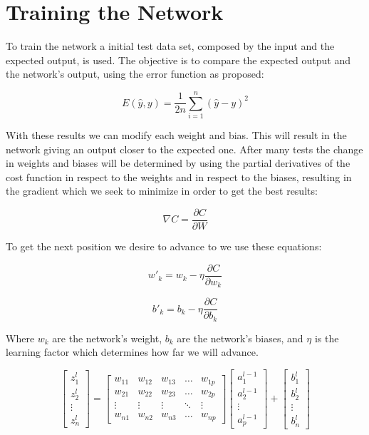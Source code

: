 \documentclass[a4paper, 12pts]{amsart}
\begin{document}
\section{Training the Network}
To train the network a initial test data set, composed by the input and the expected output, is used. The objective is to compare the expected output and the network's output, using the error function as proposed:

\[E(\hat{y}, y) = \frac{1}{2n}\sum_{i=1}^{n} (\hat{y}-y)^2\]


With these results we can modify each weight and bias. This will result in the network giving an output closer to the expected one. After many tests the change in weights and biases will be determined by using the partial derivatives of the cost function in respect to the weights and in respect to the biases, resulting in the gradient which we seek to minimize in order to get the best results:

\[\nabla C = \frac{\partial C}{\partial W}\]

To get the next position we desire to advance to we use these equations:

\[ w'_k = w_k - \eta\frac{\partial C}{\partial w_k}\]


\[b'_k = b_k - \eta\frac{\partial C}{\partial b_k}\]

Where $w_k$ are the network's weight, $b_k$ are the network's biases, and $\eta$ is the learning factor which determines how far we will advance.


\[
  \begin{bmatrix}
    z_{1}^{l}\\
    z_{2}^{l}\\
    \vdots\\
    z_{n}^{l}
  \end{bmatrix}
   =
   \begin{bmatrix}
    w_{11} & w_{12} & w_{13} & \dots  & w_{1p} \\
    w_{21} & w_{22} & w_{23} & \dots  & w_{2p} \\
    \vdots & \vdots & \vdots & \ddots & \vdots \\
    w_{n1} & w_{n2} & w_{n3} & \dots  & w_{np}
\end{bmatrix}
   \begin{bmatrix}
    a_{1}^{l-1}\\
    a_{2}^{l-1}\\
    \vdots\\
    a_{p}^{l-1}
  \end{bmatrix}
  +
  \begin{bmatrix}
    b_{1}^{l}\\
    b_{2}^{l}\\
    \vdots\\
    b_{n}^{l}
  \end{bmatrix}
\]
\end{document}
